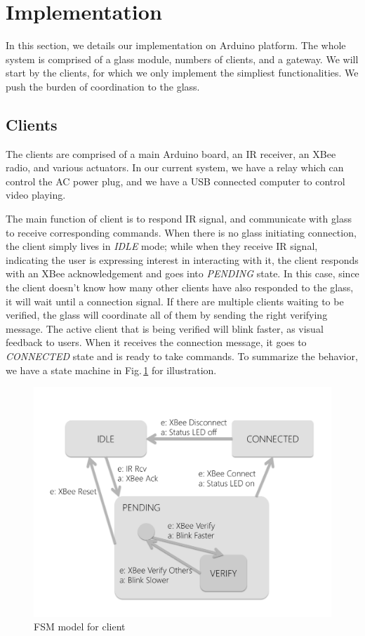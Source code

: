 
\section{Implementation}
\label{sec:implementation}

In this section, we details our implementation on Arduino \cite{Arduino} platform. The whole system is comprised of a glass module, numbers of clients, and a gateway. We will start by the clients, for which we only implement the simpliest functionalities. We push the burden of coordination to the glass.

\subsection{Clients}
The clients are comprised of a main Arduino board, an IR receiver, an XBee radio, and various actuators. In our current system, we have a relay which can control the AC power plug, and we have a USB connected computer to control video playing. 

The main function of client is to respond IR signal, and communicate with glass to receive corresponding commands. When there is no glass initiating connection, the client simply lives in {\it IDLE} mode; while when they receive IR signal, indicating the user is expressing interest in interacting with it, the client responds with an XBee acknowledgement and goes into {\it PENDING} state. In this case, since the client doesn't know how many other clients have also responded to the glass, it will wait until a connection signal. If there are multiple clients waiting to be verified, the glass will coordinate all of them by sending the right verifying message. The active client that is being verified will blink faster, as visual feedback to users. When it receives the connection message, it goes to {\it CONNECTED} state and is ready to take commands. To summarize the behavior, we have a state machine in Fig.\,\ref{fig:clientFSM} for illustration. 

\begin{figure}
  \centering
  \includegraphics[width=\linewidth]{../figs/clientFSM.pdf}
  \caption{FSM model for client}
  \label{fig:clientFSM}
\end{figure}

